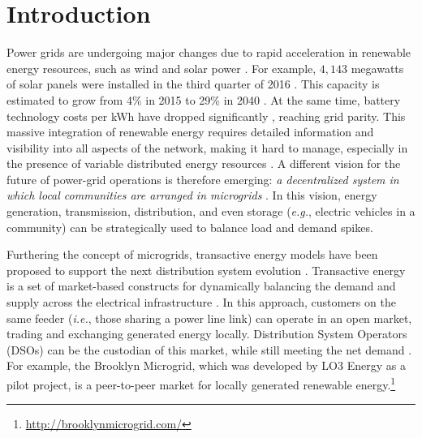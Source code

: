 \section{Introduction}


Power grids are undergoing major changes due to rapid
acceleration in renewable energy resources, such as wind and solar power \cite{5430489}. 
For example, $4,\!143$ megawatts of solar panels were installed in the
third quarter of 2016 \cite{seia}. This capacity is estimated to grow
from 4\% in 2015 to 29\% in 2040 \cite{Randal}. At the same time,
battery technology costs per kWh have dropped significantly
\cite{stock2015powerful}, reaching grid parity.
This massive integration of renewable energy requires detailed
information and visibility into all aspects of the network, making it
hard to manage, especially in the presence of variable distributed
energy resources \cite{7452738}. A different vision for the future of
power-grid operations is therefore emerging: {\em a decentralized
  system in which local communities are arranged in microgrids}
\cite{rahimi2012transactive}. In this vision, energy generation,
transmission, distribution, and even storage (\emph{e.g.}, electric
vehicles in a community) can be strategically used to balance load and
demand spikes.

Furthering the concept of microgrids, transactive energy models have
been proposed to support the next distribution system evolution
\cite{kok2016society,cox2013structured,melton2013gridwise}. Transactive
energy is a set of market-based constructs for dynamically balancing
the demand and supply across the electrical infrastructure
\cite{melton2013gridwise}. In this approach, customers on the same
feeder (\emph{i.e.}, those sharing a power line link) can operate in an
open market, trading and exchanging generated energy
locally. Distribution System Operators (DSOs) can be the custodian of
this market, while still meeting the net demand \cite{7462854}. For
example, the Brooklyn Microgrid, which was developed by LO3 Energy as
a pilot project, is a peer-to-peer market for locally generated
renewable energy.\footnote{\url{http://brooklynmicrogrid.com/}}

